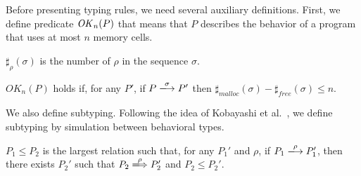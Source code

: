 

Before presenting typing rules, we need several auxiliary definitions.
First, we define predicate \(\mathit{OK}_n(P)\) that means that \(P\)
describes the behavior of a program that uses at most \(n\) memory
cells.

\begin{myDef}[\(\sharp_{\rho}(\sigma)\)]
 \label{df:sharf}
\(\sharp_{\rho}(\sigma)\) is the number of \(\rho\) in the sequence
\(\sigma\).
\end{myDef}


\begin{myDef}
\label{df:okn}
\(OK_{n}(P)\) holds if, for any \(P'\), if \(P
\xlongrightarrow{\sigma}P'\) then
\(\sharp_{malloc}(\sigma)-\sharp_{free}(\sigma)\le n\).
\end{myDef}

We also define subtyping.  Following the idea of Kobayashi et
al.~\cite{}, we define subtyping by simulation between behavioral
types.

 \begin{myDef}[Subtype]

\(P_1 \le P_2\) is the largest relation such that, for any \(P_1'\)
and \(\rho\), if \(P_1 \xlongrightarrow{\rho} P_1'\), then there
exists \(P_2'\) such that \(P_2 \xLongrightarrow{\rho} P_2'\) and
\(P_2 \le P_2'\).

\label{df:subtype}
\end{myDef}

